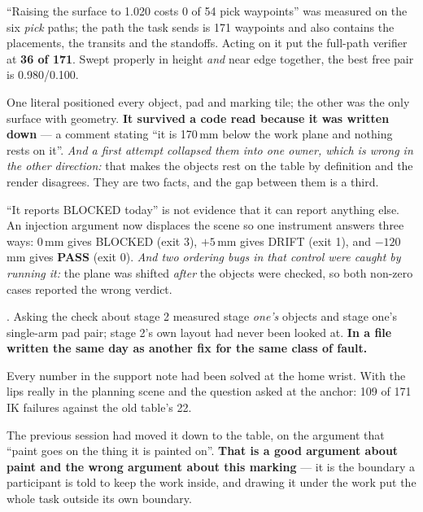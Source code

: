 {``Raising the surface to 1.020 costs 0 of 54 pick waypoints'' was measured on
the six \emph{pick} paths; the path the task sends is 171 waypoints and also
contains the placements, the transits and the standoffs. Acting on it put the
full-path verifier at \textbf{36 of 171}. Swept properly in height \emph{and}
near edge together, the best free pair is 0.980/0.100.}

{One literal positioned every object, pad and marking tile; the other was the
only surface with geometry. \textbf{It survived a code read because it was
written down} --- a comment stating ``it is 170\,mm below the work plane and
nothing rests on it''. \textit{And a first attempt collapsed them into one
owner, which is wrong in the other direction:} that makes the objects rest on
the table by definition and the render disagrees. They are two facts, and the
gap between them is a third.}

{``It reports BLOCKED today'' is not evidence that it can report anything else.
An injection argument now displaces the scene so one instrument answers three
ways: 0\,mm gives BLOCKED (exit 3), $+5$\,mm gives DRIFT (exit 1), and
$-120$\,mm gives \textbf{PASS} (exit 0). \textit{And two ordering bugs in that
control were caught by running it:} the plane was shifted \emph{after} the
objects were checked, so both non-zero cases reported the wrong verdict.}

{. Asking the check about
stage 2 measured stage \emph{one's} objects and stage one's single-arm pad pair;
stage 2's own layout had never been looked at. \textbf{In a file written the same
day as another fix for the same class of fault.}}

{Every number in the support note had been solved at the home wrist. With the
lips really in the planning scene and the question asked at the anchor: 109 of
171 IK failures against the old table's 22.}

{The previous session had moved it down to the table, on the argument that
``paint goes on the thing it is painted on''. \textbf{That is a good argument
about paint and the wrong argument about this marking} --- it is the boundary a
participant is told to keep the work inside, and drawing it under the work put
the whole task outside its own boundary.}

